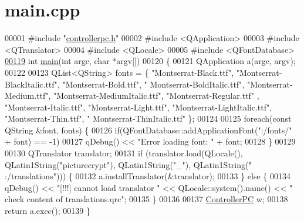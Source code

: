 \hypertarget{main_8cpp_source}{}\section{main.\+cpp}
\label{main_8cpp_source}

\begin{DoxyCode}
00001 \textcolor{preprocessor}{#include "\hyperlink{controllerpc_8h}{controllerpc.h}"}
00002 \textcolor{preprocessor}{#include <QApplication>}
00003 \textcolor{preprocessor}{#include <QTranslator>}
00004 \textcolor{preprocessor}{#include <QLocale>}
00005 \textcolor{preprocessor}{#include <QFontDatabase>}
\hypertarget{main_8cpp_source.tex_l00119}{}\hyperlink{main_8cpp_a0ddf1224851353fc92bfbff6f499fa97}{00119} \textcolor{keywordtype}{int} \hyperlink{main_8cpp_a0ddf1224851353fc92bfbff6f499fa97}{main}(\textcolor{keywordtype}{int} argc, \textcolor{keywordtype}{char} *argv[])
00120 \{
00121     QApplication a(argc, argv);
00122 
00123     QList<QString> fonts = \{ \textcolor{stringliteral}{"Montserrat-Black.ttf"}, \textcolor{stringliteral}{"Montserrat-BlackItalic.ttf"}, \textcolor{stringliteral}{"Montserrat-Bold.ttf"}, \textcolor{stringliteral}{"
      Montserrat-BoldItalic.ttf"}, \textcolor{stringliteral}{"Montserrat-Medium.ttf"}, \textcolor{stringliteral}{"Montserrat-MediumItalic.ttf"}, \textcolor{stringliteral}{"Montserrat-Regular.ttf"}
      , \textcolor{stringliteral}{"Montserrat-Italic.ttf"}, \textcolor{stringliteral}{"Montserrat-Light.ttf"}, \textcolor{stringliteral}{"Montserrat-LightItalic.ttf"}, \textcolor{stringliteral}{"Montserrat-Thin.ttf"}, \textcolor{stringliteral}{"
      Montserrat-ThinItalic.ttf"} \};
00124 
00125     \textcolor{keywordflow}{foreach}(\textcolor{keyword}{const} QString &font, fonts) \{
00126         \textcolor{keywordflow}{if}(QFontDatabase::addApplicationFont(\textcolor{stringliteral}{":/fonts/"} + font) == -1)
00127             qDebug() << \textcolor{stringliteral}{"Error loading font: "} + font;
00128     \}
00129 
00130     QTranslator translator;
00131     \textcolor{keywordflow}{if} (translator.load(QLocale(), QLatin1String(\textcolor{stringliteral}{"picturecrypt"}), QLatin1String(\textcolor{stringliteral}{"\_"}), QLatin1String(\textcolor{stringliteral}{"
      :/translations"}))) \{
00132         a.installTranslator(&translator);
00133     \} \textcolor{keywordflow}{else} \{
00134         qDebug() << \textcolor{stringliteral}{"[!!!] cannot load translator "} << QLocale::system().name() << \textcolor{stringliteral}{" check content of
       translations.qrc"};
00135     \}
00136 
00137     \hyperlink{class_controller_p_c}{ControllerPC} w;
00138     \textcolor{keywordflow}{return} a.exec();
00139 \}
\end{DoxyCode}
